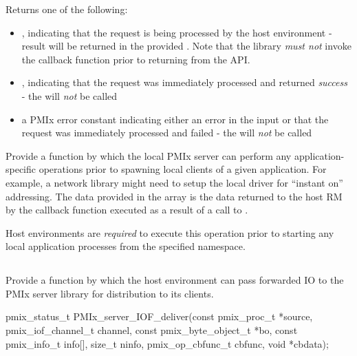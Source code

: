 Returns one of the following:

\begin{itemize}
    \item {}, indicating that the request is being processed by the host environment - result will be returned in the provided . Note that the library \emph{must not} invoke the callback function prior to returning from the \ac{API}.
    \item {}, indicating that the request was immediately processed and returned \textit{success} - the  will \textit{not} be called
    \item a PMIx error constant indicating either an error in the input or that the request was immediately processed and failed - the  will \textit{not} be called
\end{itemize}


\descr

Provide a function by which the local \ac{PMIx} server can perform any application-specific operations prior to spawning local clients of a given application. For example, a network library might need to setup the local driver for ``instant on'' addressing. The data provided in the  array is the data returned to the host \ac{RM} by the callback function executed as a result of a call to .

\advicermstart
Host environments are \textit{required} to execute this operation prior to starting any local application processes from the specified namespace.
\advicermend

\subsection{}

\summary

Provide a function by which the host environment can pass forwarded \ac{IO} to the \ac{PMIx} server library for distribution to its clients.

\format

\cspecificstart
\begin{codepar}
pmix_status_t
PMIx_server_IOF_deliver(const pmix_proc_t *source,
                        pmix_iof_channel_t channel,
                        const pmix_byte_object_t *bo,
                        const pmix_info_t info[], size_t ninfo,
                        pmix_op_cbfunc_t cbfunc, void *cbdata);
\end{codepar}
\cspecificend

